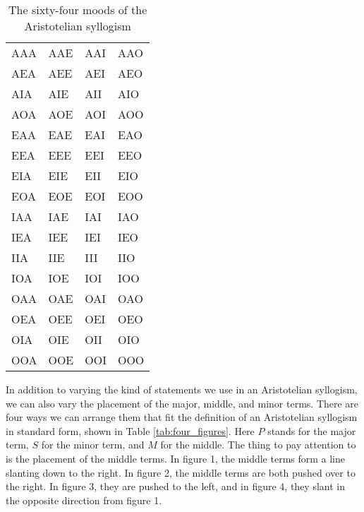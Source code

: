 \begin{table}[!ht]
\begin{tabu}{X[1,c] X[1,c] X[1,c] X[1,c]}
AAA & AAE & AAI & AAO \\
AEA & AEE & AEI & AEO \\
AIA & AIE & AII & AIO \\
AOA & AOE & AOI & AOO \\
EAA & EAE & EAI & EAO \\
EEA & EEE & EEI & EEO \\
EIA & EIE & EII & EIO \\
EOA & EOE & EOI & EOO \\
IAA & IAE & IAI & IAO \\
IEA & IEE & IEI & IEO \\
IIA & IIE & III & IIO \\
IOA & IOE & IOI & IOO \\
OAA & OAE & OAI & OAO \\
OEA & OEE & OEI & OEO \\
OIA & OIE & OII & OIO \\
OOA & OOE & OOI & OOO \\
\end{tabu}
\caption{The sixty-four moods of the Aristotelian syllogism}
\label{tab:sixty_four_moods}
\end{table}

In addition to varying the kind of statements we use in an Aristotelian syllogism, we can also vary the placement of the major, middle, and minor terms. There are four ways we can arrange them that fit the definition of an Aristotelian syllogism in standard form, shown in Table \ref{tab:four_figures}. Here $P$ stands for the major term, $S$ for the minor term, and $M$ for the middle. The thing to pay attention to is the placement of the middle terms. In figure 1, the middle terms form a line slanting down to the right. In figure 2, the middle terms are both pushed over to the right. In figure 3, they are pushed to the left, and in figure 4, they slant in the opposite direction from figure 1.

